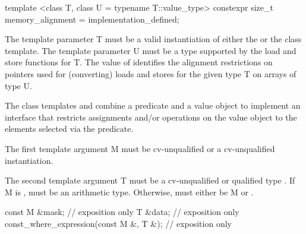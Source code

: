\begin{itemdecl}
template <class T, class U = typename T::value_type>
constexpr size_t memory_alignment = implementation_defined;
\end{itemdecl}
\begin{itemdescr}
  \pnum\requires The template parameter \type T must be a valid instantiation of either the \datapar or the \mask class template.
  \pnum\requires The template parameter \type U must be a type supported by the load and store functions for \type T.
  \pnum The value of  identifies the alignment restrictions on pointers used for (converting) loads and stores for the given type \type T on arrays of type \type U.
\end{itemdescr}



\pnum The class templates  and  combine a predicate and a value object to implement an interface that restricts assignments and/or operations on the value object to the elements selected via the predicate.

\pnum The first template argument \type M must be cv-unqualified \bool or a cv-unqualified \mask instantiation.

\pnum The second template argument \type T must be a cv-unqualified or \const qualified type .
If \type M is \bool,  must be an arithmetic type.
Otherwise,  must either be \type M or .

\begin{itemdecl}
const M &mask;                           // exposition only
T &data;                                 // exposition only
const_where_expression(const M &, T &);  // exposition only
\end{itemdecl}
\begin{itemdescr}
  \pnum{}

  \pnum{}
\end{itemdescr}

